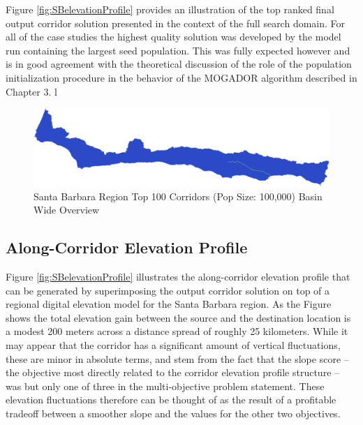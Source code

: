 Figure \ref{fig:SBelevationProfile} provides an illustration of the top ranked final output corridor solution presented in the context of the full search domain. For all of the case studies the highest quality solution was developed by the model run containing the largest seed population. This was fully expected however and is in good agreement with the theoretical discussion of the role of the population initialization procedure in the behavior of the MOGADOR algorithm described in Chapter 3. l

        \begin{figure}[!h]
            \begin{center}
            \includegraphics[width=5.5in]{figures/SantaBarbara_PathwayLarge.png}   
            \caption{Santa Barbara Region Top 100 Corridors (Pop Size: 100,000) Basin Wide Overview}
            \label{fig:SBsolutionOverview}
            \end{center}
        \end{figure}
        
    \subsection{Along-Corridor Elevation Profile}
    
Figure \ref{fig:SBelevationProfile} illustrates the along-corridor elevation profile that can be generated by superimposing the output corridor solution on top of a regional digital elevation model for the Santa Barbara region. As the Figure shows the total elevation gain between the source and the destination location is a modest 200 meters across a distance spread of roughly 25 kilometers. While it may appear that the corridor has a significant amount of vertical fluctuations, these are minor in absolute terms, and stem from the fact that the slope score -- the objective most directly related to the corridor elevation profile structure -- was but only one of three in the multi-objective problem statement. These elevation fluctuations therefore can be thought of as the result of a profitable tradeoff between a smoother slope and the values for the other two objectives. 
        
